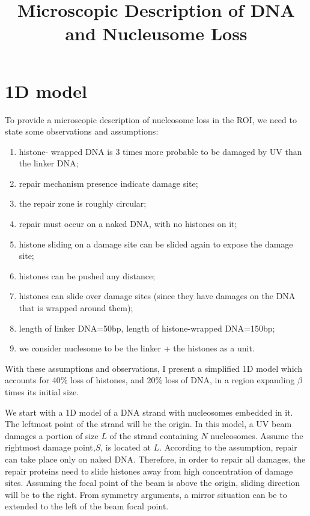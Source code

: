 \documentclass[12pt]{paper}
\begin{document}
\title{Microscopic Description of DNA and Nucleusome Loss}
\maketitle
\section{1D model}
  To provide a microscopic description of nucleosome loss in the ROI, we need to state some observations and assumptions:
  \begin{enumerate}
  	\itemsep0em
  	\item histone- wrapped DNA is 3 times more probable to be damaged by UV than the linker DNA;
  	\item repair mechanism presence indicate damage site;
  	\item the repair zone is roughly circular;  
  	\item repair must occur on a naked DNA, with no histones on it; 
  	\item histone sliding on a damage site can be slided again to expose the damage site;
  	\item histones can be pushed any distance;
  	\item histones can slide over damage sites (since they have damages on the DNA that is wrapped around them);
  	\item length of linker DNA=50bp, length of histone-wrapped DNA=150bp;
  	\item we consider nuclesome to be the linker + the histones as a unit.   
  \end{enumerate}
     With these assumptions and observations, I present a simplified 1D model which accounts for 40\% loss of histones, and 20\% loss of DNA, in a region expanding $\beta$ times its initial size. 
     
     We start with a 1D model of a DNA strand with nucleosomes embedded in it. The leftmost point of the strand will be the origin. In this model, a UV beam damages a portion of size $L$ of the strand containing $N$ nucleosomes. Assume the rightmost damage point,$S$, is located at $L$. According to the assumption, repair can take place only on naked DNA. Therefore, in order to repair all damages, the repair proteins need to slide histones away from high concentration of damage sites. Assuming the focal point of the beam is above the origin, sliding direction will be to the right. From symmetry arguments, a mirror situation can be to extended to the left of the beam focal point.     
     
\end{document}
